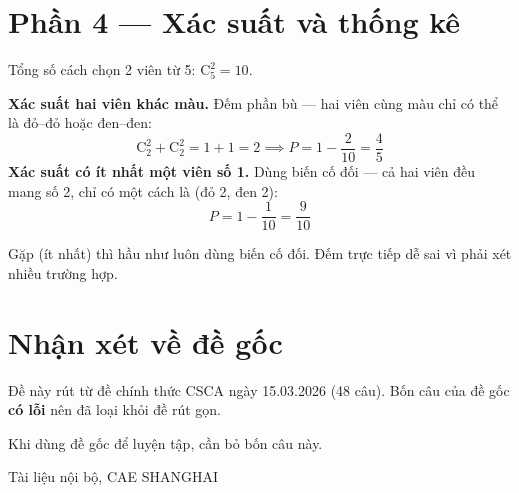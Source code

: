 \documentclass[11pt, a4paper]{article}
\begin{document}
\section{Phần 4 — Xác suất và thống kê}

\begin{dapan}[20 — Đáp án D]
Tổng số cách chọn 2 viên từ 5: $\mathrm{C}_5^2=10$.

\textbf{Xác suất hai viên khác màu.} Đếm phần bù — hai viên cùng màu chỉ có thể là đỏ–đỏ hoặc đen–đen:
\[
\mathrm{C}_2^2+\mathrm{C}_2^2=1+1=2 \implies P=1-\frac{2}{10}=\frac{4}{5}
\]
\textbf{Xác suất có ít nhất một viên số 1.} Dùng biến cố đối — cả hai viên đều mang số 2, chỉ có một cách là (đỏ 2, đen 2):
\[
P=1-\frac{1}{10}=\frac{9}{10}
\]

 Gặp  (ít nhất) thì hầu như luôn dùng biến cố đối. Đếm trực tiếp dễ sai vì phải xét nhiều trường hợp.
\end{dapan}

\section{Nhận xét về đề gốc}

Đề này rút từ đề chính thức CSCA ngày 15.03.2026 (48 câu). Bốn câu của đề gốc \textbf{có lỗi} nên đã loại khỏi đề rút gọn.


\vspace{0.3cm}
\noindent Khi dùng đề gốc để luyện tập, cần bỏ bốn câu này.

\vspace{0.8cm}
\begin{center}
{\footnotesize\color{cae_blue} Tài liệu nội bộ, CAE SHANGHAI}
\end{center}
\end{document}
